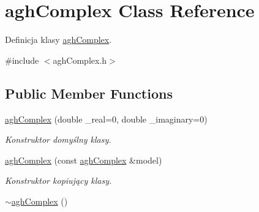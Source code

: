 \hypertarget{classaghComplex}{\section{agh\-Complex \-Class \-Reference}
\label{classaghComplex}
}


\-Definicja klasy \hyperlink{classaghComplex}{agh\-Complex}.  




{\ttfamily \#include $<$agh\-Complex.\-h$>$}

\subsection*{\-Public \-Member \-Functions}
\begin{DoxyCompactItemize}
\item 
\hyperlink{classaghComplex_ad560693a912de9458546ee16fe9326c2}{agh\-Complex} (double \-\_\-real=0, double \-\_\-imaginary=0)
\begin{DoxyCompactList}\small\item\em \-Konstruktor domyślny klasy. \end{DoxyCompactList}\item 
\hyperlink{classaghComplex_a46110214b867c99a7309df69aef39ea4}{agh\-Complex} (const \hyperlink{classaghComplex}{agh\-Complex} \&model)
\begin{DoxyCompactList}\small\item\em \-Konstruktor kopiujący klasy. \end{DoxyCompactList}\item 
\hypertarget{classaghComplex_aa283826062a93f54ecb9077f06968d43}{\hyperlink{classaghComplex_aa283826062a93f54ecb9077f06968d43}{$\sim$agh\-Complex} ()}\label{classaghComplex_aa283826062a93f54ecb9077f06968d43}


\end{DoxyCompactItemize}
